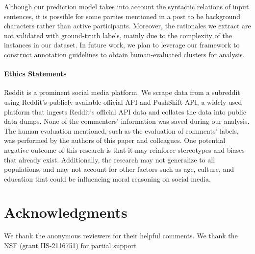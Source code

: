 \documentclass[letterpaper]{article} %
\begin{document}
Although our prediction model takes into account the syntactic relations of input sentences, it is possible for some parties mentioned in a post to be background characters rather than active participants.
Moreover, the rationales we extract are not validated with ground-truth labels, mainly due to the complexity of the instances in our dataset.
In future work, we plan to leverage our framework to construct annotation guidelines to obtain human-evaluated clusters for analysis.

\paragraph{Ethics Statements}

Reddit is a prominent social media platform.
We scrape data from a subreddit using Reddit's publicly available official API and PushShift API, a widely used platform that ingests Reddit's official API data and collates the data into public data dumps.
None of the commenters' information was saved during our analysis.
The human evaluation mentioned, such as the evaluation of comments' labels, was performed by the authors of this paper and colleagues.
One potential negative outcome of this research is that it may reinforce stereotypes and biases that already exist. 
Additionally, the research may not generalize to all populations, and may not account for other factors such as age, culture, and education that could be influencing moral reasoning on social media.

\section*{Acknowledgments}

We thank the anonymous reviewers for their helpful comments. 
We thank the NSF (grant IIS-2116751) for partial support

% 
\end{document}
